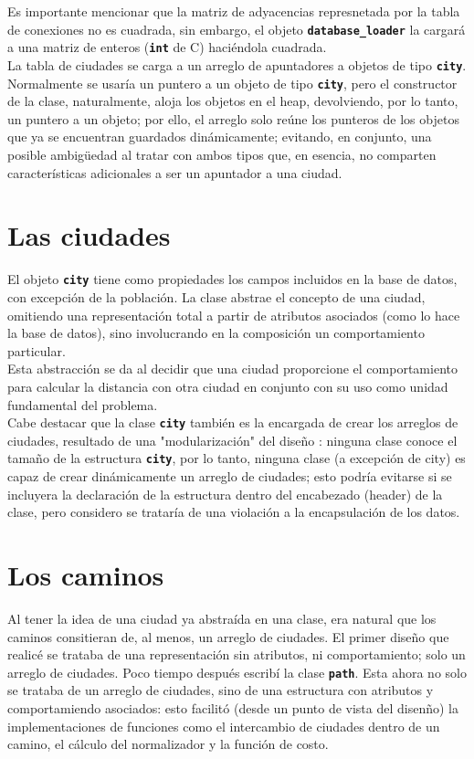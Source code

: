 \documentclass[a4paper]{report}
\begin{document}
Es importante mencionar que la matriz de adyacencias represnetada por la tabla de
conexiones no es cuadrada, sin embargo, el objeto \textbf{\texttt{database\_loader}}
la cargar\'a  a una matriz de enteros (\textbf{\texttt{int}} de C) haci\'endola cuadrada.\\

La tabla de ciudades se carga a un arreglo de apuntadores a objetos de tipo
\textbf{\texttt{city}}. Normalmente se usar\'ia un puntero a un objeto de tipo
\textbf{\texttt{city}}, pero el constructor de la clase, naturalmente, aloja los
objetos en el heap, devolviendo, por lo tanto, un puntero a un objeto;
por ello, el arreglo solo re\'une los punteros de los objetos que
ya se encuentran guardados din\'amicamente; evitando, en conjunto,
una posible ambig\"uedad al tratar con ambos tipos que, en esencia, no
comparten caracter\'isticas adicionales a ser un apuntador a una ciudad.

\section{Las ciudades}
El objeto \textbf{\texttt{city}} tiene como propiedades los campos incluidos en la base de
datos, con excepci\'on de la poblaci\'on. La clase abstrae el concepto de una
ciudad, omitiendo una representaci\'on total a partir de atributos asociados
(como lo hace la base de datos), sino involucrando en la composici\'on un
comportamiento particular.\\

Esta abstracci\'on se da al decidir que una ciudad proporcione el comportamiento
para calcular la distancia con otra ciudad en conjunto con su uso como unidad
fundamental del problema.\\

Cabe destacar que la clase \textbf{\texttt{city}} tambi\'en es la encargada de crear los
arreglos de ciudades, resultado de una "modularizaci\'on" del dise\~no : ninguna clase
conoce el tama\~no de la estructura \textbf{\texttt{city}}, por lo tanto, ninguna clase (a
excepci\'on de city) es capaz de crear din\'amicamente un arreglo de ciudades; esto
podr\'ia evitarse si se incluyera la declaraci\'on de la estructura dentro del encabezado
(header) de la clase, pero considero se tratar\'ia de una violaci\'on a la encapsulaci\'on
de los datos.

\section{Los caminos}
Al tener la idea de una ciudad ya abstra\'ida en una clase, era natural que los caminos consitieran
de, al menos, un arreglo de ciudades. El primer dise\~no que realic\'e se trataba de una representaci\'on
sin atributos, ni comportamiento; solo un arreglo de ciudades. Poco tiempo despu\'es escrib\'i la
clase \textbf{\texttt{path}}. Esta ahora no solo se trataba de un arreglo de ciudades, sino de
una estructura con atributos y comportamiendo asociados: esto facilit\'o (desde un punto de vista
del disen\~no) la implementaciones de funciones como el intercambio de ciudades dentro de un camino,
el c\'alculo del normalizador y la funci\'on de costo.\\
\end{document}
